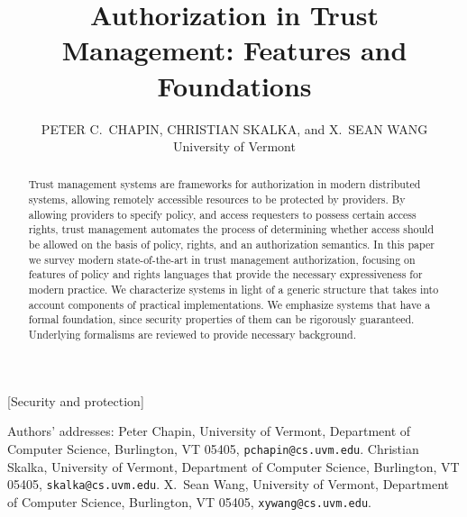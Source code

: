 

\title{Authorization in Trust Management: Features and Foundations}

\author{
PETER C.~CHAPIN, CHRISTIAN SKALKA, and X.~SEAN WANG \\ University of Vermont
}


\begin{abstract} 
Trust management systems are frameworks for authorization in modern
distributed systems, allowing remotely accessible resources to be
protected by providers.  By allowing providers to specify policy, and
access requesters to possess certain access rights, trust management
automates the process of determining whether access should be allowed
on the basis of policy, rights, and an authorization semantics.  In
this paper we survey modern state-of-the-art in trust management
authorization, focusing on features of policy and rights languages
that provide the necessary expressiveness for modern practice.  We
characterize systems in light of a generic structure that takes into
account components of practical implementations.  We emphasize systems
that have a formal foundation, since security properties of them can
be rigorously guaranteed.  Underlying formalisms are reviewed to
provide necessary background.
\end{abstract}

[Security and protection]



\begin{bottomstuff}
Authors' addresses: Peter Chapin, University of Vermont, Department of
Computer Science, Burlington, VT 05405, \texttt{pchapin@cs.uvm.edu}.
Christian Skalka, University of Vermont, Department of Computer
Science, Burlington, VT 05405, \texttt{skalka@cs.uvm.edu}.
X.~Sean Wang, University of Vermont, Department of Computer
Science, Burlington, VT 05405, \texttt{xywang@cs.uvm.edu}.
\end{bottomstuff}

\maketitle
